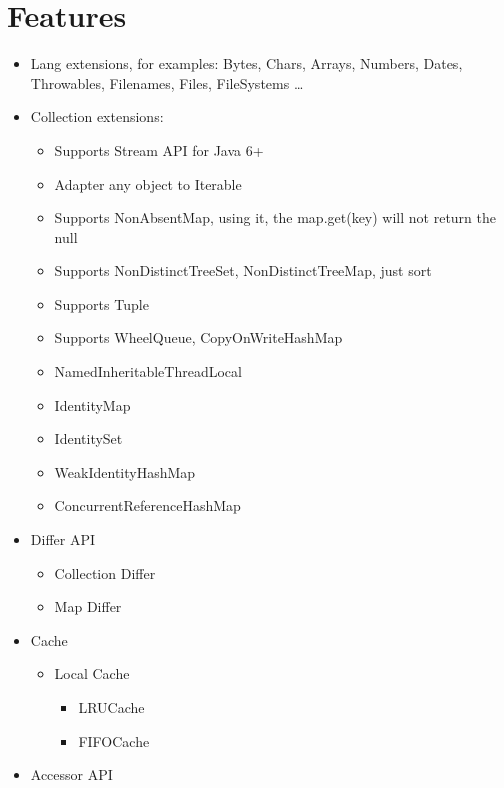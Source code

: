 \documentclass[
]{book}
\providecommand{\tightlist}{%
  \setlength{\itemsep}{0pt}\setlength{\parskip}{0pt}}
\begin{document}
\hypertarget{langx-java_features}{%
\section{Features}\label{langx-java_features}}

\begin{itemize}
\tightlist
\item
  Lang extensions, for examples: Bytes, Chars, Arrays, Numbers, Dates, Throwables, Filenames, Files, FileSystems \ldots{}
\item
  Collection extensions:

  \begin{itemize}
  \tightlist
  \item
    Supports Stream API for Java 6+
  \item
    Adapter any object to Iterable
  \item
    Supports NonAbsentMap, using it, the map.get(key) will not return the null
  \item
    Supports NonDistinctTreeSet, NonDistinctTreeMap, just sort
  \item
    Supports Tuple
  \item
    Supports WheelQueue, CopyOnWriteHashMap
  \item
    NamedInheritableThreadLocal
  \item
    IdentityMap
  \item
    IdentitySet
  \item
    WeakIdentityHashMap
  \item
    ConcurrentReferenceHashMap
  \end{itemize}
\item
  Differ API

  \begin{itemize}
  \tightlist
  \item
    Collection Differ
  \item
    Map Differ
  \end{itemize}
\item
  Cache

  \begin{itemize}
  \tightlist
  \item
    Local Cache

    \begin{itemize}
    \tightlist
    \item
      LRUCache
    \item
      FIFOCache
    \end{itemize}
  \end{itemize}
\item
  Accessor API


\end{itemize}
\end{document}

